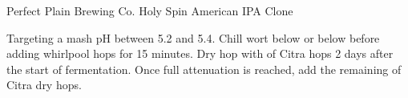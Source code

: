 \begin{recipe}{Perfect Plain Brewing Co. Holy Spin American IPA Clone}

\begin{aboutblock}
\sourceaha
\end{aboutblock}


\begin{methodandtiming}
 
\begin{mashsteps}
\end{mashsteps}

\begin{directions}
Targeting a mash pH between 5.2 and 5.4. Chill wort below  or below
before adding whirlpool hops for 15 minutes. Dry hop with  of Citra
hops 2 days after the start of fermentation. Once full attenuation
is reached, add the remaining  of Citra dry hops.
\end{directions}

\end{methodandtiming}

\recipebreak

\begin{ingredientsblock}

\begin{malts}
\end{malts}

\begin{hops}
\end{hops}


\end{ingredientsblock}

\end{recipe}

